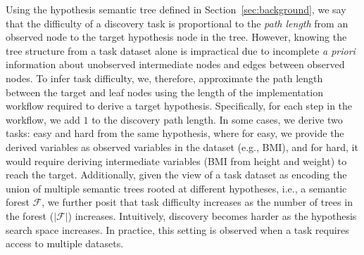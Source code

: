 Using the hypothesis semantic tree defined in Section~\ref{sec:background}, we say that the difficulty of a discovery task is proportional to the \textit{path length} from an observed node to the target hypothesis node in the tree.
However, knowing the tree structure from a task dataset alone is impractical due to incomplete \textit{a priori} information about unobserved intermediate nodes and edges between observed nodes. 
To infer task difficulty, we, therefore, approximate the path length between the target and leaf nodes using the length of the implementation workflow required to derive a target hypothesis. Specifically, for each step in the workflow, we add $1$ to the discovery path length.
In some cases, we derive two tasks: easy and hard from the same hypothesis, where for easy, we provide the derived variables as observed variables in the dataset (e.g., BMI), and for hard, it would require deriving intermediate variables (BMI from height and weight) to reach the target.
Additionally, given the view of a task dataset as encoding the union of multiple semantic trees rooted at different hypotheses, i.e., a semantic forest $\mathcal{F}$, we further posit that task difficulty increases as the number of trees in the forest ($|\mathcal{F}|$) increases. Intuitively, discovery becomes harder as the hypothesis search space increases. In practice, this setting is observed when a task requires access to multiple datasets. 

